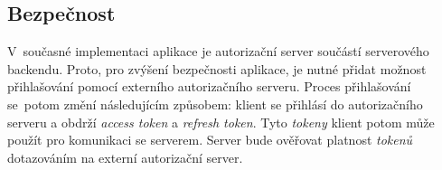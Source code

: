     \subsection{Bezpečnost}
        V~současné implementaci aplikace je autorizační server součástí serverového backendu. Proto, pro zvýšení bezpečnosti aplikace, je nutné přidat možnost přihlašování pomocí externího autorizačního serveru. Proces přihlašování se~potom změní následujícím způsobem: klient se přihlásí do autorizačního serveru a obdrží \textit{access token} a \textit{refresh token}. 
        Tyto \textit{tokeny} klient potom může použít pro komunikaci se serverem. Server bude ověřovat platnost \textit{tokenů} dotazováním na externí autorizační server.
